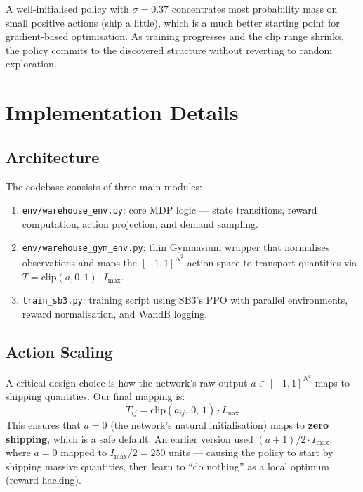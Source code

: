 \documentclass[11pt]{article}
\begin{document}
A well-initialised policy with $\sigma=0.37$ concentrates most probability mass on small positive actions (ship a little), which is a much better starting point for gradient-based optimisation. As training progresses and the clip range shrinks, the policy commits to the discovered structure without reverting to random exploration.

\section{Implementation Details}

\subsection{Architecture}

The codebase consists of three main modules:

\begin{enumerate}[nosep]
    \item \texttt{env/warehouse\_env.py}: core MDP logic — state transitions, reward computation, action projection, and demand sampling.
    \item \texttt{env/warehouse\_gym\_env.py}: thin Gymnasium wrapper that normalises observations and maps the $[-1,1]^{N^2}$ action space to transport quantities via $T = \text{clip}(a, 0, 1) \cdot I_{\max}$.
    \item \texttt{train\_sb3.py}: training script using SB3's PPO with parallel environments, reward normalisation, and WandB logging.
\end{enumerate}

\subsection{Action Scaling}

A critical design choice is how the network's raw output $a \in [-1, 1]^{N^2}$ maps to shipping quantities. Our final mapping is:
\[
    T_{ij} = \text{clip}(a_{ij},\, 0,\, 1) \cdot I_{\max}
\]
This ensures that $a=0$ (the network's natural initialisation) maps to \textbf{zero shipping}, which is a safe default. An earlier version used $(a+1)/2 \cdot I_{\max}$, where $a=0$ mapped to $I_{\max}/2 = 250$ units --- causing the policy to start by shipping massive quantities, then learn to ``do nothing'' as a local optimum (reward hacking).
\end{document}
